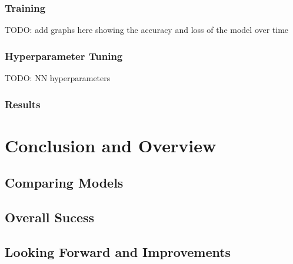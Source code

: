 \documentclass[12pt,twocolumn]{article}
\begin{document}
\subsubsection{Training}
TODO: add graphs here showing the accuracy and loss of the model over time

\subsubsection{Hyperparameter Tuning}
TODO: NN hyperparameters

\subsubsection{Results}

\section{Conclusion and Overview}
\subsection{Comparing Models}

\subsection{Overall Sucess}

\subsection{Looking Forward and Improvements}
\end{document}
